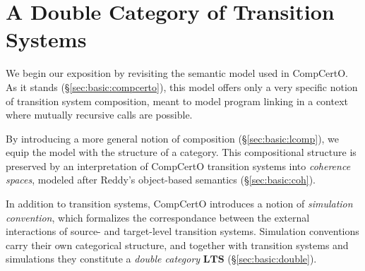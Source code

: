 \documentclass[acmsmall,screen,review,anonymous]{acmart}
\begin{document}






\section{A Double Category of Transition Systems} \label{sec:base} %


We begin our exposition by revisiting
the semantic model used in CompCertO.
As it stands (\S\ref{sec:basic:compcerto}),
this model offers only a very specific notion
of transition system composition,
meant to model program linking
in a context where
mutually recursive calls are possible.

By introducing a more general notion of composition (\S\ref{sec:basic:lcomp}),
we equip the model with the structure of a category.
This compositional structure
is preserved by an interpretation of CompCertO transition systems
into \emph{coherence spaces},
modeled after Reddy's object-based semantics (\S\ref{sec:basic:coh}).

In addition to transition systems,
CompCertO introduces a notion of \emph{simulation convention},
which formalizes the correspondance between the external interactions
of source- and target-level transition systems.
Simulation conventions carry their own categorical structure,
and together with transition systems and simulations
they constitute
a \emph{double category} $\mathbf{LTS}$ (\S\ref{sec:basic:double}).
\end{document}
